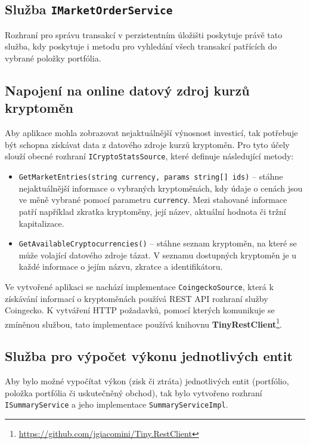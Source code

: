 \documentclass[12pt, a4paper]{article}
\begin{document}
    \subsection{Služba \texttt{IMarketOrderService}}
    Rozhraní pro správu transakcí v perzistentním úložišti poskytuje právě tato služba, kdy poskytuje i metodu pro vyhledání všech transakcí patřících do vybrané položky portfólia.

    \subsection{Napojení na online datový zdroj kurzů kryptoměn}
    Aby aplikace mohla zobrazovat nejaktuálnější výnosnost investicí, tak potřebuje být schopna získávat data z datového zdroje kurzů kryptoměn.
    Pro tyto účely slouží obecné rozhraní \texttt{ICryptoStatsSource}, které definuje následující metody:

    \begin{itemize}
        \item \texttt{GetMarketEntries(string currency, params string[] ids)} -- stáhne nejaktuálnější informace o vybraných kryptoměnách, kdy údaje o cenách jsou ve měně vybrané pomocí parametru \texttt{currency}.
        Mezi stahované informace patří například zkratka kryptoměny, její název, aktuální hodnota či tržní kapitalizace.
        \item \texttt{GetAvailableCryptocurrencies()} -- stáhne seznam kryptoměn, na které se může volající datového zdroje tázat.
        V seznamu dostupných kryptoměn je u každé informace o jejím názvu, zkratce a identifikátoru.
    \end{itemize}

    Ve vytvořené aplikaci se nachází implementace \texttt{CoingeckoSource}, která k získávání informací o kryptoměnách používá REST API rozhraní služby Coingecko.
    K vytváření HTTP požadavků, pomocí kterých komunikuje se zmíněnou službou, tato implementace používá knihovnu \textbf{TinyRestClient}\footnote{\url{https://github.com/jgiacomini/Tiny.RestClient}}.
    
    \subsection{Služba pro výpočet výkonu jednotlivých entit}
    Aby bylo možné vypočítat výkon (zisk či ztráta) jednotlivých entit (portfólio, položka portfólia či uskutečněný obchod), tak bylo vytvořeno rozhraní \texttt{ISummaryService} a jeho implementace \texttt{SummaryServiceImpl}.
    
\end{document}
